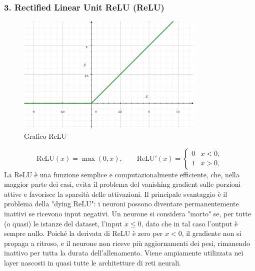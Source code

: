 \documentclass[a4paper,12pt]{report}
\begin{document}
	\subsubsection{3. Rectified Linear Unit ReLU (ReLU)}
	\begin{figure}[H]
		\centering
		\includegraphics[width=0.8\textwidth]{img/relu.png}
		\caption{Grafico ReLU}
	\end{figure}
	\[
	\mathrm{ReLU}(x)=\max(0,x),\qquad
	\mathrm{ReLU}'(x)=\begin{cases}0 & x<0,\\ 1 & x>0,\end{cases}
	\]
	La ReLU è una funzione semplice e computazionalmente efficiente, che, nella maggior parte dei casi, evita il problema del vanishing gradient sulle porzioni attive e favorisce la sparsità delle attivazioni. Il principale svantaggio è il problema della "dying ReLU": i neuroni possono diventare permanentemente inattivi se ricevono input negativi. Un neurone si considera "morto" se, per tutte (o quasi) le istanze del dataset, l'input $x \le 0$, dato che in tal caso l'output è sempre nullo. Poiché la derivata di ReLU è zero per $x<0$, il gradiente non si propaga a ritroso, e il neurone non riceve più aggiornamenti dei pesi, rimanendo inattivo per tutta la durata dell'allenamento. Viene ampiamente utilizzata nei layer nascosti in quasi tutte le architetture di reti neurali.
	
\end{document}
